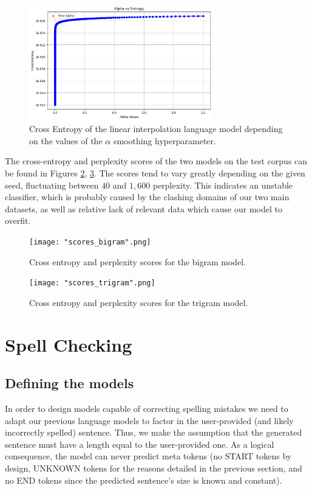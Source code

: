 \documentclass[11pt, a4paper]{article}
\begin{document}
	
	\begin{figure}
		\centering
		\includegraphics[width=8cm]{"interpolation_alpha.png"}
		\caption{Cross Entropy of the linear interpolation language model depending on the values of the $\alpha$ smoothing hyperparameter.}
		\label{fig::li_alpha_entropy}
	\end{figure}


	The cross-entropy and perplexity scores of the two models on the test corpus can be found in Figures \ref{fig::scores_bigram}, \ref{fig::scores_trigram}. The scores tend to vary greatly depending on the given seed, fluctuating between $40$ and $1,600$ perplexity. This indicates an unstable classifier, which is probably caused by the clashing domains of our two main datasets, as well as relative lack of relevant data which cause our model to overfit.

	\begin{figure}
	    \centering
	    \texttt{[image: "scores\_bigram".png]}
	    \caption{Cross entropy and perplexity scores for the bigram model.}
	    \label{fig::scores_bigram}
	\end{figure}
	
	\begin{figure}
	    \centering
	    \texttt{[image: "scores\_trigram".png]}
	    \caption{Cross entropy and perplexity scores for the trigram model.}
	    \label{fig::scores_trigram}
	\end{figure}


	
	\section{Spell Checking}
	
	
	\subsection{Defining the models}
	
	In order to design models capable of correcting spelling mistakes we need to adapt our previous language models to factor in the user-provided (and likely incorrectly spelled) sentence. Thus, we make the assumption that the generated sentence must have a length equal to the user-provided one. As a logical consequence, the model can never predict meta tokens (no START tokens by design, UNKNOWN tokens for the reasons detailed in the previous section, and no END tokens since the predicted sentence's size is known and constant).
	
\end{document}
